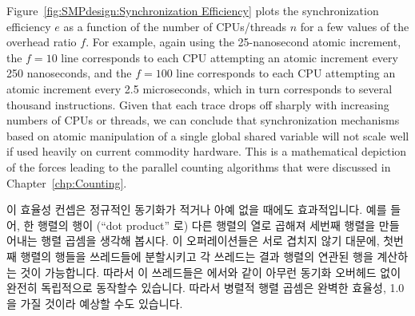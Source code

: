 Figure~\ref{fig:SMPdesign:Synchronization Efficiency} plots the synchronization
efficiency $e$ as a function of the number of CPUs/threads $n$ for
a few values of the overhead ratio $f$.
For example, again using the 25-nanosecond atomic increment, the
$f=10$ line corresponds to each CPU attempting an atomic increment
every 250 nanoseconds, and the $f=100$ line corresponds to each
CPU attempting an atomic increment every 2.5 microseconds,
which in turn corresponds to several thousand instructions.
Given that each trace drops off sharply with increasing numbers of
CPUs or threads, we can conclude that
synchronization mechanisms based on
atomic manipulation of a single global shared variable will not
scale well if used heavily on current commodity hardware.
This is a mathematical depiction of the forces leading to the parallel
counting algorithms that were discussed in Chapter~\ref{chp:Counting}.
\fi

이 효율성 컨셉은 정규적인 동기화가 적거나 아예 없을 때에도 효과적입니다.
예를 들어, 한 행렬의 행이 (``dot product'' 로) 다른 행렬의 열로 곱해져 세번째
행렬을 만들어내는 행렬 곱셈을 생각해 봅시다.
이 오퍼레이션들은 서로 겹치지 않기 대문에, 첫번째 행렬의 행들을 쓰레드들에
분할시키고 각 쓰레드는 결과 행렬의 연관된 행을 계산하는 것이 가능합니다.
따라서 이 쓰레드들은  에서와 같이 아무런 동기화 오버헤드 없이
완전히 독립적으로 동작할수 있습니다.
따라서 병렬적 행렬 곱셈은 완벽한 효율성, 1.0을 가질 것이라 예상할 수도
있습니다.

